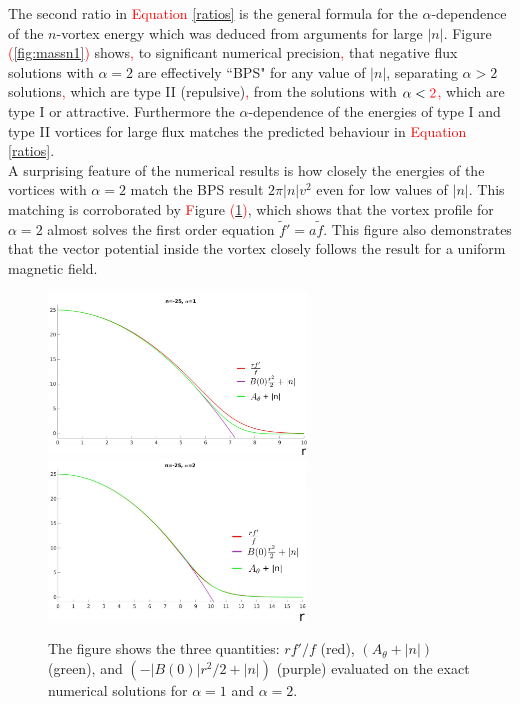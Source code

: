 The second ratio in \textcolor{red}{Equation} \eqref{ratios} is the general formula for the $\alpha$-dependence of the $n$-vortex energy which was deduced from arguments for large $|n|$. Figure \textcolor{red}{(}\ref{fig:massn1}\textcolor{red}{)} shows\textcolor{red}{,} to significant numerical precision\textcolor{red}{,} that negative flux solutions with $\alpha=2$ are effectively ``BPS" for any value of  $|n|$, separating $\alpha> 2$ solutions\textcolor{red}{,} which are type II (repulsive)\textcolor{red}{,} from the solutions with $\alpha < \textcolor{red}{2}$\textcolor{red}{,} which are type I or attractive. Furthermore the $\alpha$-dependence of the energies of type I and type II vortices for large flux matches the predicted behaviour in \textcolor{red}{Equation} \eqref{ratios}. \\
\indent A surprising feature of the numerical results is how closely the energies of the vortices with $\alpha=2$  match the BPS result $2\pi |n| v^2$ even for low values of $|n|$. This matching is corroborated by \textcolor{red}{F}igure \textcolor{red}{(}\ref{fig:firstorder}\textcolor{red}{)}, which shows that the vortex profile for $\alpha=2$  almost solves the first order equation $\tilde f' = a \tilde f$. This figure also demonstrates that the vector potential inside the vortex closely follows the result for a uniform magnetic field.
\begin{figure}[H]
\begin{center}
    \includegraphics[width=2.70in]{Chapter_2_Folder_1912.11321/figures/firstorderalpha1_corrected.pdf} \hspace{0.1in}
      \includegraphics[width=2.7in]{Chapter_2_Folder_1912.11321/figures/firstorderalpha2_corrected.pdf} 
    \caption[This figure shows three quantities that ought to match in the BPS vortex.]{{\small The figure shows the three quantities: $rf'/f$ (red), $\left(A_\theta+|n|\right)$ (green), and $\left(-|B(0)|r^2/2+|n|\right)$ (purple) evaluated on the exact numerical solutions for $\alpha=1$ and $\alpha=2$.}} \label{fig:firstorder}
    \end{center}
\end{figure}
